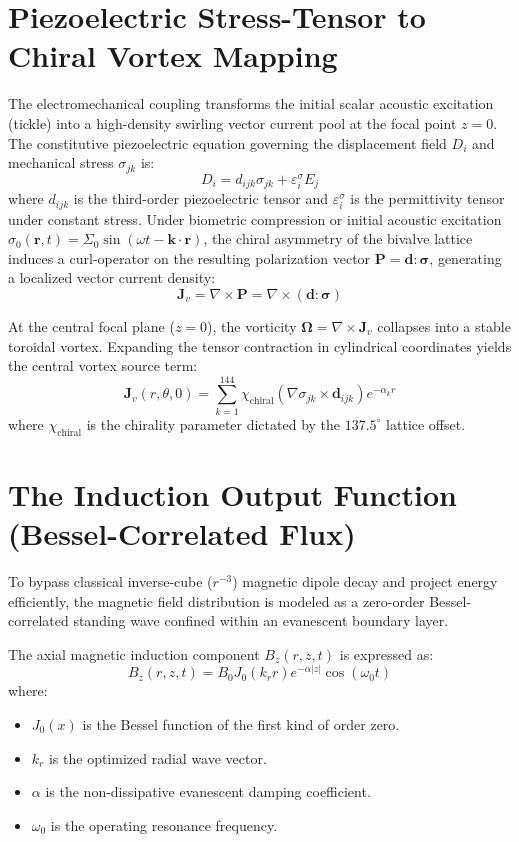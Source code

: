 \documentclass{article}
\begin{document}
\section{Piezoelectric Stress-Tensor to Chiral Vortex Mapping}
The electromechanical coupling transforms the initial scalar acoustic excitation (tickle) into a high-density swirling vector current pool at the focal point $z = 0$. The constitutive piezoelectric equation governing the displacement field $D_i$ and mechanical stress $\sigma_{jk}$ is:
$$ D_i = d_{ijk} \sigma_{jk} + \varepsilon_i^\sigma E_j $$
where $d_{ijk}$ is the third-order piezoelectric tensor and $\varepsilon_i^\sigma$ is the permittivity tensor under constant stress. Under biometric compression or initial acoustic excitation $\sigma_0(\mathbf{r}, t) = \Sigma_0 \sin(\omega t - \mathbf{k} \cdot \mathbf{r})$, the chiral asymmetry of the bivalve lattice induces a curl-operator on the resulting polarization vector $\mathbf{P} = \mathbf{d} : \boldsymbol{\sigma}$, generating a localized vector current density:
$$ \mathbf{J}_v = \nabla \times \mathbf{P} = \nabla \times (\mathbf{d} : \boldsymbol{\sigma}) $$

At the central focal plane ($z = 0$), the vorticity $\boldsymbol{\Omega} = \nabla \times \mathbf{J}_v$ collapses into a stable toroidal vortex. Expanding the tensor contraction in cylindrical coordinates yields the central vortex source term:
$$ \mathbf{J}_v(r, \theta, 0) = \sum_{k=1}^{144} \chi_{\text{chiral}} \left( \nabla \sigma_{jk} \times \mathbf{d}_{ijk} \right) e^{-\alpha_k r} $$
where $\chi_{\text{chiral}}$ is the chirality parameter dictated by the $137.5^\circ$ lattice offset.

\section{The Induction Output Function (Bessel-Correlated Flux)}
To bypass classical inverse-cube ($r^{-3}$) magnetic dipole decay and project energy efficiently, the magnetic field distribution is modeled as a zero-order Bessel-correlated standing wave confined within an evanescent boundary layer.

The axial magnetic induction component $B_z(r, z, t)$ is expressed as:
$$ B_z(r, z, t) = B_0 J_0(k_r r) e^{-\alpha |z|} \cos(\omega_0 t) $$
where:
\begin{itemize}
    \item $J_0(x)$ is the Bessel function of the first kind of order zero.
    \item $k_r$ is the optimized radial wave vector.
    \item $\alpha$ is the non-dissipative evanescent damping coefficient.
    \item $\omega_0$ is the operating resonance frequency.
\end{itemize}
\end{document}
